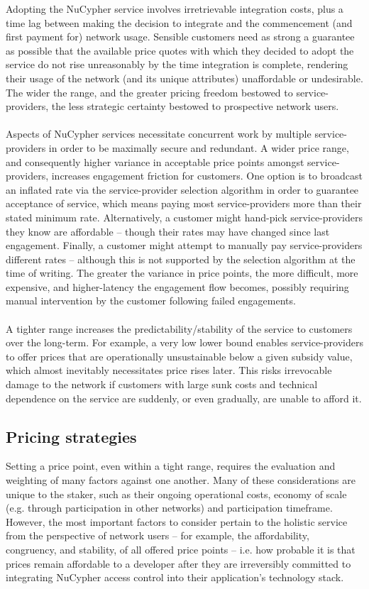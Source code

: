 \documentclass[longbibliography,nofootinbib]{revtex4-1}
\begin{document}
Adopting the NuCypher service involves irretrievable integration costs, plus a time lag between making the decision to integrate and the commencement (and first payment for) network usage. Sensible customers need as strong a guarantee as possible that the available price quotes with which they decided to adopt the service do not rise unreasonably by the time integration is complete, rendering their usage of the network (and its unique attributes) unaffordable or undesirable. The wider the range, and the greater pricing freedom bestowed to service-providers, the less strategic certainty bestowed to prospective network users.
\\\\
Aspects of NuCypher services necessitate concurrent work by multiple service-providers in order to be maximally secure and redundant. A wider price range, and consequently higher variance in acceptable price points amongst service-providers, increases engagement friction for customers. One option is to broadcast an inflated rate via the service-provider selection algorithm in order to guarantee acceptance of service, which means paying most service-providers more than their stated minimum rate. Alternatively, a customer might hand-pick service-providers they know are affordable – though their rates may have changed since last engagement. Finally, a customer might attempt to manually pay service-providers different rates – although this is not supported by the selection algorithm at the time of writing. The greater the variance in price points, the more difficult, more expensive, and higher-latency the engagement flow becomes, possibly requiring manual intervention by the customer following failed engagements.
\\\\
A tighter range increases the predictability/stability of the service to customers over the long-term. For example, a very low lower bound enables service-providers to offer prices that are operationally unsustainable below a given subsidy value, which almost inevitably necessitates price rises later. This risks irrevocable damage to the network if customers with large sunk costs and technical dependence on the service are suddenly, or even gradually, are unable to afford it. 


\subsection{Pricing strategies}

Setting a price point, even within a tight range, requires the evaluation and weighting of many factors against one another. Many of these considerations are unique to the staker, such as their ongoing operational costs, economy of scale (e.g. through participation in other networks) and participation timeframe. However, the most important factors to consider pertain to the holistic service from the perspective of network users – for example, the affordability, congruency, and stability, of all offered price points – i.e. how probable it is that prices remain affordable to a developer after they are irreversibly committed to integrating NuCypher access control into their application’s technology stack.
\end{document}
